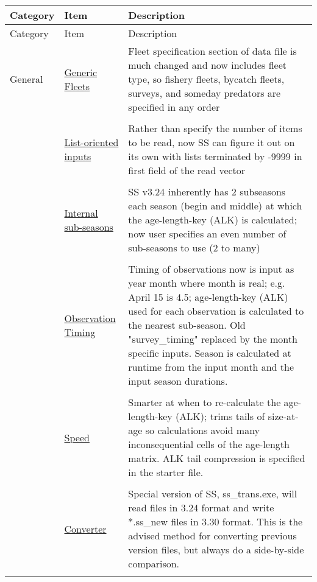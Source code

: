 \documentclass[12pt]{article}
\begin{document}
\begin{center}
	\begin{longtable}{p{2cm} p{3cm} p{10cm}}
	Category & Item & Description\\
	\hline
	\endfirsthead
	
	Category & Item & Description\\
	\hline
	\endhead
	
	\hline
	\endfoot
	
	\endlastfoot
	
	General & 
	\hyperlink{GenericFleets}{Generic Fleets} & 
	Fleet specification section of data file is much changed and now includes fleet type, so fishery fleets, bycatch fleets, surveys, and someday predators are specified in any order\\
	\\
	& \hyperlink{ListBased}{List-oriented inputs} & 
	Rather than specify the number of items to be read, now SS can figure it out on its own with lists terminated by -9999 in first field of the read vector \\
	\\					  
	& \hyperlink{SubSeas}{Internal sub-seasons} & 
	SS v3.24 inherently has 2 subseasons each season (begin and middle) at which the age-length-key (ALK) is calculated; now user specifies an even number of sub-seasons to use (2 to many) \\
	\\
	& \hyperlink{ObsTiming}{Observation Timing} & 
	Timing of observations now is input as year month where month is real; e.g. April 15 is 4.5; age-length-key (ALK) used for each observation is calculated to the nearest sub-season.  Old "survey\_timing" replaced by the month specific inputs.  Season is calculated at runtime from the input month and the input season durations. \\
	\\
	& \hyperlink{ALK}{Speed} & 
	Smarter at when to re-calculate the age-length-key (ALK); trims tails of size-at-age so calculations avoid many inconsequential cells of the age-length matrix. ALK tail compression is specified in the starter file.\\
	\\				
	& \hyperlink{Convert} {Converter} & 
	Special version of SS, ss\_trans.exe, will read files in 3.24 format and write *.ss\_new files in 3.30 format.  This is the advised method for converting previous version files, but always do a side-by-side comparison.\\
	\\

\end{longtable}
\end{center}
\end{document}

